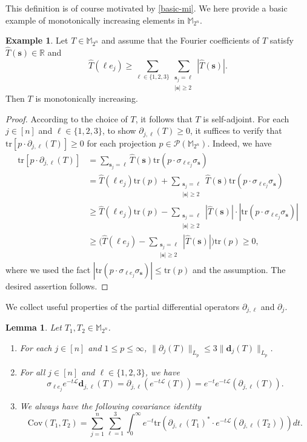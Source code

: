 \documentclass{amsbook}
\newtheorem{lemma}[theorem]{Lemma}
\theoremstyle{definition}
\newtheorem{example}[theorem]{Example}
\theoremstyle{remark}
\numberwithin{section}{chapter}
\numberwithin{equation}{chapter}
\newcommand{\M}{\mathbb{M}}
\newcommand{\1}{\mathbf{1}}
\newcommand{\s}{\mathbf{s}}
\newcommand{\La}{\mathcal{L}}
\newcommand{\dc}{\mathbf{d}}
\begin{document}
This definition is of course motivated by \eqref{basic-mi}. 
We here provide a basic example of monotonically increasing
elements in $\M_{2^n}$. 
\begin{example}\label{ex-mo-in-o}  Let  $T\in \mathbb{M}_{2^n}$ and assume that the Fourier coefficients of $T$ satisfy $\widehat{T}(\s)\in\mathbb{R}$ and 
	$$\widehat{T}(\ell e_j)\geq \sum_{\ell\in\{1,2,3\}}\sum_{\substack{\s_j=\ell \\ |\s|\geq2}} |\widehat{T}(\s)|.$$
	Then $T$ is monotonically increasing.
\end{example}
\begin{proof} According to the choice of $T$, it follows that $T$ is self-adjoint. For each $j\in[n]$ and $\ell\in\{1,2,3\}$, to show $\partial_{j,\ell}(T)\geq0$, it suffices to verify that $\mathrm{tr}[p\cdot\partial_{j,\ell}(T)]\geq0$ for each projection $p\in\mathcal{P}(\mathbb{M}_{2^n})$. Indeed, we have
	\begin{align*}
		\mathrm{tr}[p\cdot\partial_{j,\ell}(T)]&=\sum_{\s_j=\ell}\widehat{T}(\s)\mathrm{tr}(p\cdot\sigma_{\ell e_j}\sigma_\s)\\
		&=\widehat{T}(\ell e_j)\mathrm{tr}(p)+\sum_{\substack{\s_j=\ell\\ |\s|\geq2}}\widehat{T}(\s)\mathrm{tr}(p\cdot\sigma_{\ell e_j}\sigma_\s)\\
		&\geq \widehat{T}(\ell e_j)\mathrm{tr}(p)-\sum_{\substack{\s_j=\ell \\ |\s|\geq2}}|\widehat{T}(\s)| \cdot |\mathrm{tr}(p\cdot\sigma_{\ell e_j}\sigma_\s)|\\
		&\geq\big(\widehat{T}(\ell e_j)-\sum_{\substack{\s_j=\ell  \\ |\s|\geq2}}|\widehat{T}(\s)|\big)\mathrm{tr}(p)\geq 0,
	\end{align*}
	where we used the fact $|\mathrm{tr}(p\cdot\sigma_{\ell e_j}\sigma_\s)|\leq \mathrm{tr}(p)$ and the assumption. The desired assertion follows.
\end{proof}


We  collect useful properties of the partial differential operators $\partial_{j,\ell}$ and $\partial_j$.

\begin{lemma}\label{comparison}
	Let $T_1, T_2\in \M_{2^{n}}$.
	\begin{enumerate}[{\rm (i)}]
		\item For each $j\in [n]$ and $1\leq p\leq\infty$, $\|\partial_{j}(T)\|_{L_{p}}\leq 3\|\dc_{j}(T)\|_{L_{p}}$.
		\item For all $j\in [n]$ and $\ell\in\{1,2,3\}$, we have $$\sigma_{\ell e_j}e^{-t\mathcal{L}}\dc_{j,\ell}(T)=\partial_{j,\ell}\left(e^{-t\La}(T)\right)=e^{-t}e^{-t\La}\left(\partial_{j,\ell}(T)\right).$$

		\item We always have the following covariance identity
	\begin{equation}\label{key-identity}
		\mathrm{Cov}(T_1,T_2)=\sum_{j=1}^{n}\sum_{\ell=1}^{3}\int_{0}^{\infty}e^{-t}\mathrm{tr}\left(\partial_{j,\ell}(T_1)^*\cdot e^{-t\La}\left(\partial_{j,\ell}(T_2)\right)\right)dt.
	\end{equation}
	\end{enumerate}
\end{lemma}
\end{document}
